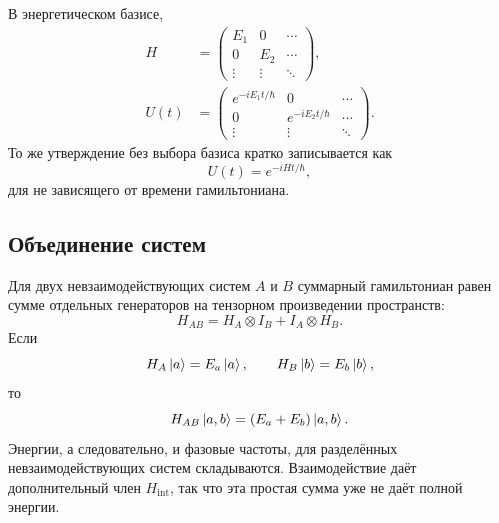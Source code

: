 В энергетическом базисе,
\begin{equation}
\begin{aligned}
H&=
\begin{pmatrix}
E_1&0&\cdots\\
0&E_2&\cdots\\
\vdots&\vdots&\ddots
\end{pmatrix},\\[0.6em]
U(t)&=
\begin{pmatrix}
e^{-iE_1t/\hbar}&0&\cdots\\
0&e^{-iE_2t/\hbar}&\cdots\\
\vdots&\vdots&\ddots
\end{pmatrix}.
\end{aligned}
\end{equation}
То же утверждение без выбора базиса кратко записывается как
\begin{equation}
\boxed{U(t)=e^{-iHt/\hbar}},
\end{equation}
для не зависящего от времени гамильтониана.

\begin{classroomqa}
\end{classroomqa}

\subsection{Объединение систем}

Для двух невзаимодействующих систем \(A\) и \(B\) суммарный гамильтониан равен сумме отдельных генераторов на тензорном произведении пространств:
\begin{equation}
H_{AB}
=
H_A\otimes I_B+I_A\otimes H_B.
\end{equation}
Если
\begin{equation}
H_A\left\lvert a\right\rangle=E_a\left\lvert a\right\rangle,
\qquad
H_B\left\lvert b\right\rangle=E_b\left\lvert b\right\rangle,
\end{equation}
то
\begin{equation}
H_{AB}\left\lvert a,b\right\rangle=(E_a+E_b)\left\lvert a,b\right\rangle.
\end{equation}
Энергии, а следовательно, и фазовые частоты, для разделённых невзаимодействующих систем складываются. Взаимодействие даёт дополнительный член \(H_{\mathrm{int}}\), так что эта простая сумма уже не даёт полной энергии.

